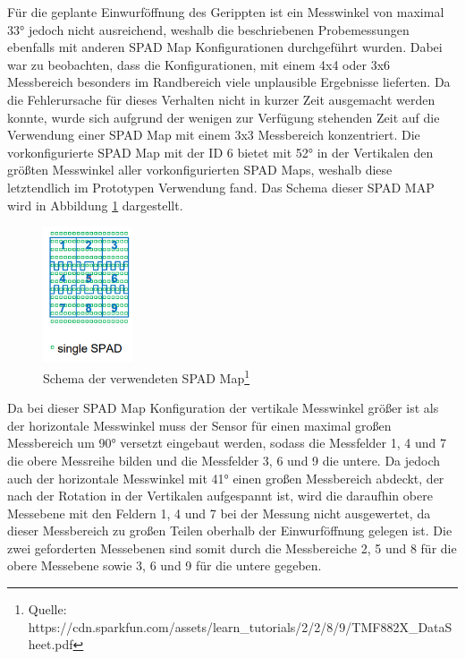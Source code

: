         Für die geplante Einwurföffnung des Gerippten ist ein Messwinkel von  maximal 33° jedoch nicht ausreichend, weshalb die beschriebenen Probemessungen ebenfalls mit anderen SPAD Map Konfigurationen durchgeführt wurden. Dabei war zu beobachten, dass die Konfigurationen, mit einem 4x4 oder 3x6 Messbereich besonders im Randbereich viele unplausible Ergebnisse lieferten. Da die Fehlerursache für dieses Verhalten nicht in kurzer Zeit ausgemacht werden konnte, wurde sich aufgrund der wenigen zur Verfügung stehenden Zeit auf die Verwendung einer SPAD Map mit einem 3x3 Messbereich konzentriert. Die vorkonfigurierte SPAD Map mit der ID 6 bietet mit 52° in der Vertikalen den größten Messwinkel aller vorkonfigurierten SPAD Maps, weshalb diese letztendlich im Prototypen Verwendung fand. Das Schema dieser SPAD MAP wird in Abbildung \ref{fig:SPAD-Map_6} dargestellt.\\

        \begin{figure}[H]
            \begin{center}
                \includegraphics[height=4cm]{media/03_technical_implementation/SPAD-Map_6.png}
            \end{center}
            \caption{Schema der verwendeten SPAD Map\protect\footnote{Quelle: https://cdn.sparkfun.com/assets/learn\_tutorials/2/2/8/9/TMF882X\_DataSheet.pdf}}
            \label{fig:SPAD-Map_6}
        \end{figure}

        Da bei dieser SPAD Map Konfiguration der vertikale Messwinkel größer ist als der horizontale Messwinkel muss der Sensor für einen maximal großen Messbereich um 90° versetzt eingebaut werden, sodass die Messfelder 1, 4 und 7 die obere Messreihe bilden und die Messfelder 3, 6 und 9 die untere. Da jedoch auch der horizontale Messwinkel mit 41° einen großen Messbereich abdeckt, der nach der Rotation in der Vertikalen aufgespannt ist, wird die daraufhin obere Messebene mit den Feldern 1, 4 und 7 bei der Messung nicht ausgewertet, da dieser Messbereich zu großen Teilen oberhalb der Einwurföffnung gelegen ist. Die zwei geforderten Messebenen sind somit durch die Messbereiche 2, 5 und 8 für die obere Messebene sowie 3, 6 und 9 für die untere gegeben.\\

